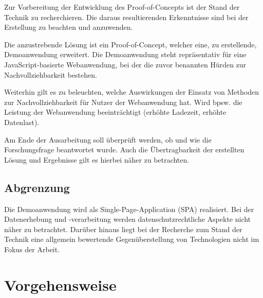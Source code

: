 
Zur Vorbereitung der Entwicklung des Proof-of-Concepts ist der Stand der Technik zu recherchieren. Die daraus resultierenden Erkenntnisse sind bei der Erstellung zu beachten und anzuwenden.

Die anzustrebende Lösung ist ein Proof-of-Concept, welcher eine, zu erstellende, Demoanwendung erweitert. Die Demoanwendung steht repräsentativ für eine JavaScript-basierte Webanwendung, bei der die zuvor benannten Hürden zur Nachvollziehbarkeit bestehen.

Weiterhin gilt es zu beleuchten, welche Auswirkungen der Einsatz von Methoden zur Nachvollziehbarkeit für Nutzer der Webanwendung hat. Wird bpsw. die Leistung der Webanwendung beeinträchtigt (erhöhte Ladezeit, erhöhte Datenlast).

Am Ende der Ausarbeitung soll überprüft werden, ob und wie die Forschungsfrage beantwortet wurde. Auch die Übertragbarkeit der erstellten Lösung und Ergebnisse gilt es hierbei näher zu betrachten.

\subsection{Abgrenzung}


Die Demoanwendung wird als Single-Page-Application (SPA) \cite{SinglePageApplication} realisiert. Bei der Datenerhebung und -verarbeitung werden datenschutzrechtliche Aspekte nicht näher zu betrachtet. Darüber hinaus liegt bei der Recherche zum Stand der Technik eine allgemein bewertende Gegenüberstellung von Technologien nicht im Fokus der Arbeit.

\pagebreak

\section{Vorgehensweise}

